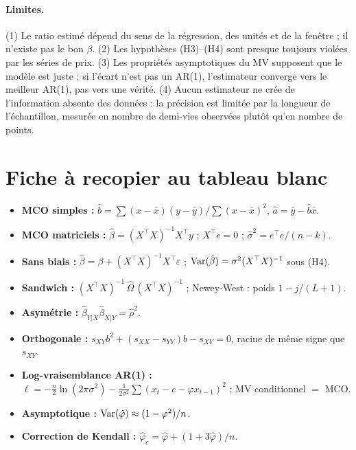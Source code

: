 \paragraph{Limites.} (1) Le ratio estimé dépend du sens de la régression, des unités et de la fenêtre ; il n'existe pas \og le\fg{} bon $\beta$. (2) Les hypothèses (H3)–(H4) sont presque toujours violées par les séries de prix. (3) Les propriétés asymptotiques du MV supposent que le modèle est juste ; si l'écart n'est pas un AR(1), l'estimateur converge vers le \og meilleur AR(1)\fg, pas vers une vérité. (4) Aucun estimateur ne crée de l'information absente des données : la précision est limitée par la longueur de l'échantillon, mesurée en nombre de demi-vies observées plutôt qu'en nombre de points.

\section{Fiche à recopier au tableau blanc}

\begin{whiteboard}
\begin{itemize}[leftmargin=1.2em]
\item \textbf{MCO simples :} $\hat b = \sum(x-\bar x)(y-\bar y)/\sum(x-\bar x)^2$, $\hat a = \bar y - \hat b\bar x$.
\item \textbf{MCO matriciels :} $\hat\beta = (X^\top X)^{-1}X^\top y$ ; $X^\top e = 0$ ; $\hat\sigma^2 = e^\top e/(n-k)$.
\item \textbf{Sans biais :} $\hat\beta = \beta + (X^\top X)^{-1}X^\top\varepsilon$ ; $\operatorname{Var}(\hat\beta) = \sigma^2(X^\top X)^{-1}$ sous (H4).
\item \textbf{Sandwich :} $(X^\top X)^{-1}\,\hat\Omega\,(X^\top X)^{-1}$ ; Newey-West : poids $1-j/(L+1)$.
\item \textbf{Asymétrie :} $\hat\beta_{Y|X}\hat\beta_{X|Y} = \hat\rho^2$.
\item \textbf{Orthogonale :} $s_{XY}b^2 + (s_{XX}-s_{YY})b - s_{XY} = 0$, racine de même signe que $s_{XY}$.
\item \textbf{Log-vraisemblance AR(1) :} $\ell = -\frac n2\ln(2\pi\sigma^2) - \frac1{2\sigma^2}\sum(x_t - c - \varphi x_{t-1})^2$ ; MV conditionnel $=$ MCO.
\item \textbf{Asymptotique :} $\operatorname{Var}(\hat\varphi)\approx(1-\varphi^2)/n$.
\item \textbf{Correction de Kendall :} $\hat\varphi_c = \hat\varphi + (1+3\hat\varphi)/n$.
\end{itemize}
\end{whiteboard}

